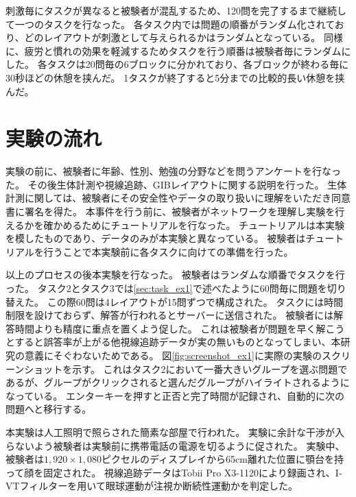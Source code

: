 \documentclass{kuee}
\begin{document}
刺激毎にタスクが異なると被験者が混乱するため、120問を完了するまで継続して一つのタスクを行なった。
各タスク内では問題の順番がランダム化されており、どのレイアウトが刺激として与えられるかはランダムとなっている。
同様に、疲労と慣れの効果を軽減するためタスクを行う順番は被験者毎にランダムにした。
各タスクは20問毎の6ブロックに分かれており、各ブロックが終わる毎に30秒ほどの休憩を挟んだ。
1タスクが終了すると5分までの比較的長い休憩を挟んだ。

\section{実験の流れ}
実験の前に、被験者に年齢、性別、勉強の分野などを問うアンケートを行なった。
その後生体計測や視線追跡、GIBレイアウトに関する説明を行った。
生体計測に関しては、被験者にその安全性やデータの取り扱いに理解をいただき同意書に署名を得た。
本事件を行う前に、被験者がネットワークを理解し実験を行えるかを確かめるためにチュートリアルを行なった。
チュートリアルは本実験を模したものであり、データのみが本実験と異なっている。
被験者はチュートリアルを行うことで本実験前に各タスクに向けての準備を行った。

以上のプロセスの後本実験を行なった。
被験者はランダムな順番でタスクを行った。
タスク2とタスク3では\ref{sec:task_ex1}で述べたように60問毎に問題を切り替えた。
この際60問は4レイアウトが15問ずつで構成された。
タスクには時間制限を設けておらず、解答が行われるとサーバーに送信された。
被験者には解答時間よりも精度に重点を置くよう促した。
これは被験者が問題を早く解こうとすると誤答率が上がる他視線追跡データが実の無いものとなってしまい、本研究の意義にそぐわないためである。
図\ref{fig:screenshot_ex1}に実際の実験のスクリーンショットを示す。
これはタスク2において一番大きいグループを選ぶ問題であるが、グループがクリックされると選んだグループがハイライトされるようになっている。
エンターキーを押すと正否と完了時間が記録され、自動的に次の問題へと移行する。

本実験は人工照明で照らされた簡素な部屋で行われた。
実験に余計な干渉が入らないよう被験者は実験前に携帯電話の電源を切るように促された。
実験中、被験者は$1,920 \times 1,080$ピクセルのディスプレイから65cm離れた位置に顎台を持って顔を固定された。
視線追跡データはTobii Pro X3-1120により録画され、I-VTフィルター\cite{olsen2012tobii}を用いて眼球運動が注視か断続性運動かを判定した。
\end{document}
